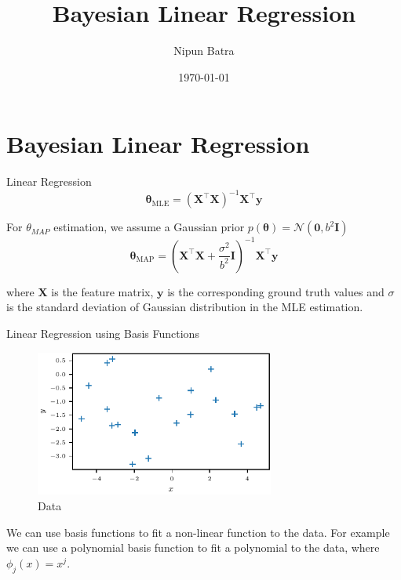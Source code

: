 \documentclass{beamer}
\begin{document}
    



\title{Bayesian Linear Regression}
\author{Nipun Batra}
\date{\today}
\maketitle
{}

\section{Bayesian Linear Regression}

\begin{frame}{Linear Regression}
\begin{equation*}
\boldsymbol{\theta}_{\mathrm{MLE}}=\left(\boldsymbol{X}^{\top} \boldsymbol{X}\right)^{-1} \boldsymbol{X}^{\top} \boldsymbol{y}
\end{equation*}

\pause For $\theta_{MAP}$ estimation, we assume a Gaussian prior $p(\boldsymbol{\theta})=\mathcal{N}\left(\mathbf{0}, b^2 \boldsymbol{I}\right)$\\
\pause \begin{equation*}
\boldsymbol{\theta}_{\mathrm{MAP}}=\left(\boldsymbol{X}^{\top} \boldsymbol{X}+\frac{\sigma^2}{b^2} \boldsymbol{I}\right)^{-1} \boldsymbol{X}^{\top} \boldsymbol{y}
\end{equation*}

\pause where $\boldsymbol{X}$ is the feature matrix, $\boldsymbol{y}$ is the corresponding ground truth values and $\sigma$ is the standard deviation of Gaussian distribution in the MLE estimation. 

\end{frame}

\begin{frame}{Linear Regression using Basis Functions}
    \begin{figure}
        \centering
        \includegraphics[width=0.7\textwidth]{../figures/MVN-BLR/data.pdf}
        \caption{Data}
    \end{figure}
    \pause We can use basis functions to fit a non-linear function to the data.
    \pause For example we can use a polynomial basis function to fit a polynomial to the data, where $\phi_j(x)=x^j$.
\end{frame}
\end{document}
